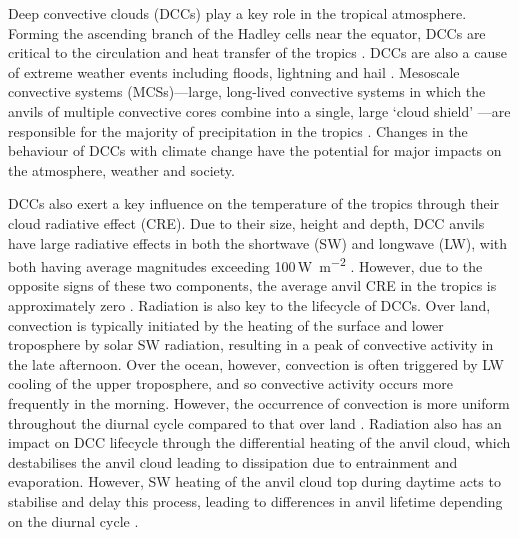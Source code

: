 \documentclass[acp, manuscript]{copernicus}
\begin{document}


\introduction  %

Deep convective clouds (DCCs) play a key role in the tropical atmosphere. 
Forming the ascending branch of the Hadley cells near the equator, DCCs are critical to the circulation and heat transfer of the tropics \citep{riehl_heat_1958, weisman_mesoscale_2015}. 
DCCs are also a cause of extreme weather events including floods, lightning and hail \citep{westra_future_2014}. 
Mesoscale convective systems (MCSs)---large, long-lived convective systems in which the anvils of multiple convective cores combine into a single, large `cloud shield' \citep{chen_diurnal_1997, houze_mesoscale_2004, roca_simple_2017}---are responsible for the majority of precipitation in the tropics \citep{feng_global_2021}. 
Changes in the behaviour of DCCs with climate change have the potential for major impacts on the atmosphere, weather and society.

DCCs also exert a key influence on the temperature of the tropics through their cloud radiative effect (CRE). 
Due to their size, height and depth, DCC anvils have large radiative effects in both the shortwave (SW) and longwave (LW), with both having average magnitudes exceeding 100\,\unit{W m^{-2}} \citep{hartmann_tropical_2016, wall_balanced_2018}. 
However, due to the opposite signs of these two components, the average anvil CRE in the tropics is approximately zero \citep{ramanathan_cloudradiative_1989, hartmann_effect_1992, stephens_cloudsat_2018}. 
Radiation is also key to the lifecycle of DCCs. 
Over land, convection is typically initiated by the heating of the surface and lower troposphere by solar SW radiation, resulting in a peak of convective activity in the late afternoon. 
Over the ocean, however, convection is often triggered by LW cooling of the upper troposphere, and so convective activity occurs more frequently in the morning. 
However, the occurrence of convection is more uniform throughout the diurnal cycle compared to that over land \citep{taylor_evaluating_2017}. 
Radiation also has an impact on DCC lifecycle through the differential heating of the anvil cloud, which destabilises the anvil cloud leading to dissipation due to entrainment and evaporation. 
However, SW heating of the anvil cloud top during daytime acts to stabilise and delay this process, leading to differences in anvil lifetime depending on the diurnal cycle \citep{harrop_role_2016, sokol_tropical_2020, wall_observational_2020}.
\end{document}
